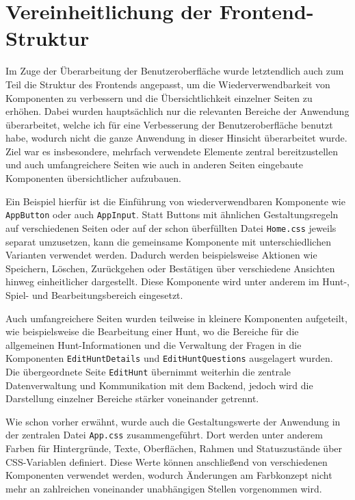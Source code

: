 ﻿\documentclass[oneside]{ausarbeitung}
\begin{document}
\section{Vereinheitlichung der Frontend-Struktur}
\label{sec:implementierung-frontend-struktur}

Im Zuge der Überarbeitung der Benutzeroberfläche wurde letztendlich auch zum Teil die Struktur des Frontends angepasst, um die Wiederverwendbarkeit 
von Komponenten zu verbessern und die Übersichtlichkeit einzelner Seiten zu erhöhen. Dabei wurden hauptsächlich nur die relevanten Bereiche der
Anwendung überarbeitet, welche ich für eine Verbesserung der Benutzeroberfläche benutzt habe, wodurch nicht die ganze Anwendung in dieser Hinsicht
überarbeitet wurde. Ziel war es insbesondere, mehrfach verwendete Elemente zentral bereitzustellen und auch umfangreichere Seiten wie auch in anderen
Seiten eingebaute Komponenten übersichtlicher aufzubauen.

Ein Beispiel hierfür ist die Einführung von wiederverwendbaren Komponente wie \texttt{AppButton} oder auch \texttt{AppInput}. Statt Buttons mit
ähnlichen Gestaltungsregeln auf verschiedenen Seiten oder auf der schon überfüllten Datei \texttt{Home.css} jeweils separat umzusetzen, kann die
gemeinsame Komponente mit unterschiedlichen Varianten verwendet werden. Dadurch werden beispielsweise Aktionen wie Speichern, Löschen, Zurückgehen
oder Bestätigen über verschiedene Ansichten hinweg einheitlicher dargestellt. Diese Komponente wird unter anderem im Hunt-, Spiel- und 
Bearbeitungsbereich eingesetzt.

Auch umfangreichere Seiten wurden teilweise in kleinere Komponenten aufgeteilt, wie beispielsweise die Bearbeitung einer Hunt, wo die Bereiche 
für die allgemeinen Hunt-Informationen und die Verwaltung der Fragen in die Komponenten \texttt{EditHuntDetails} und \texttt{EditHuntQuestions} 
ausgelagert wurden. Die übergeordnete Seite \texttt{EditHunt} übernimmt weiterhin die zentrale Datenverwaltung und Kommunikation mit dem Backend, 
jedoch wird die Darstellung einzelner Bereiche stärker voneinander getrennt.

Wie schon vorher erwähnt, wurde auch die Gestaltungswerte der Anwendung in der zentralen Datei \texttt{App.css} zusammengeführt. Dort werden unter
anderem Farben für Hintergründe, Texte, Oberflächen, Rahmen und Statuszustände über CSS-Variablen definiert. Diese Werte können anschließend von 
verschiedenen Komponenten verwendet werden, wodurch Änderungen am Farbkonzept nicht mehr an zahlreichen voneinander unabhängigen Stellen vorgenommen
wird.
\end{document}
